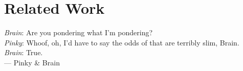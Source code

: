 \documentclass[ twoside,
                dottedtoc,
                openright,titlepage,numbers=noenddot,headinclude,%
                footinclude=true,cleardoublepage=empty,abstractoff, %
                BCOR=5mm,paper=a4,fontsize=11pt,%
                ngerman,american,%
                ]{scrreprt}\usepackage[]{graphicx}\usepackage[]{color}
\begin{document}

\frenchspacing
\raggedbottom
{} %
\pagestyle{plain}
%


\cleardoublepage
\cleardoublepage
\cleardoublepage
\cleardoublepage
\pagestyle{scrheadings}

\cleardoublepage
\cleardoublepage
{}\setcounter{page}{1}


\cleardoublepage
\chapter{Related Work}\label{chap:02}





\cleardoublepage

\cleardoublepage
\cleardoublepage
\cleardoublepage

\cleardoublepage

\cleardoublepage
\newpage
\thispagestyle{empty}
\vspace*{3cm}
\begin{center}

\emph{Brain}: Are you pondering what I'm pondering? \\
\smallskip
\emph{Pinky}: Whoof, oh, I'd have to say the odds of that are terribly slim, Brain. \\
\smallskip
\emph{Brain}: True.
\\ \medskip
    --- Pinky \& Brain
\end{center}
\cleardoublepage
\end{document}
